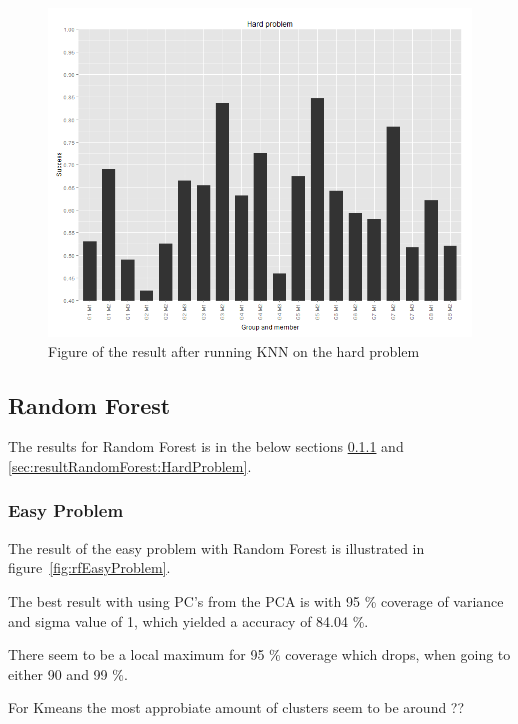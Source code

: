 \documentclass[report]{subfiles}
\begin{document}
\begin{figure}[H]
	\centering
	\includegraphics[width=1\textwidth]{images/knnHardProblem}
	\caption{Figure of the result after running KNN on the hard problem}
	\label{fig:knnHardProblem}
\end{figure}

\subsection{Random Forest}
\label{sec:resultRandomForest}
The results for Random Forest is in the below sections \ref{sec:resultRandomForest:EasyProblem} and \ref{sec:resultRandomForest:HardProblem}.

\subsubsection{Easy Problem}
\label{sec:resultRandomForest:EasyProblem}
The result of the easy problem with Random Forest is illustrated in figure~\ref{fig:rfEasyProblem}. 

The best result with using PC's from the PCA is with 95 \% coverage of variance and sigma value of 1, which yielded a accuracy of 84.04 \%.

There seem to be a local maximum for 95 \% coverage which drops, when going to either 90 and 99 \%.

For Kmeans the most approbiate amount of clusters seem to be around ?? 
\end{document}
